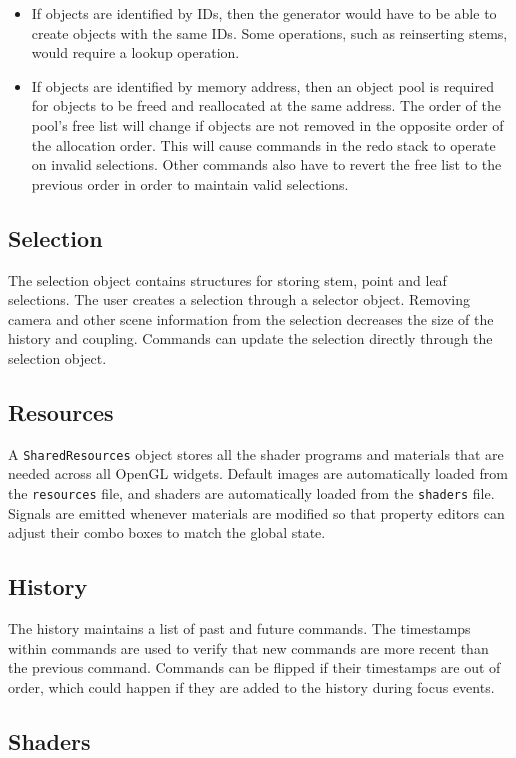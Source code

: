 \documentclass[10pt]{article}
\begin{document}
\begin{itemize}
\item If objects are identified by IDs, then the generator would have to be able to create objects with the same IDs. Some operations, such as reinserting stems, would require a lookup operation.
\item If objects are identified by memory address, then an object pool is required for objects to be freed and reallocated at the same address. The order of the pool's free list will change if objects are not removed in the opposite order of the allocation order. This will cause commands in the redo stack to operate on invalid selections. Other commands also have to revert the free list to the previous order in order to maintain valid selections.
\end{itemize}

\subsection{Selection}
The selection object contains structures for storing stem, point and leaf selections. The user creates a selection through a selector object. Removing camera and other scene information from the selection decreases the size of the history and coupling. Commands can update the selection directly through the selection object.

\subsection{Resources}
A \texttt{SharedResources} object stores all the shader programs and materials that are needed across all OpenGL widgets. Default images are automatically loaded from the \texttt{resources} file, and shaders are automatically loaded from the \texttt{shaders} file. Signals are emitted whenever materials are modified so that property editors can adjust their combo boxes to match the global state.

\subsection{History}
The history maintains a list of past and future commands. The timestamps within commands are used to verify that new commands are more recent than the previous command. Commands can be flipped if their timestamps are out of order, which could happen if they are added to the history during focus events.

\subsection{Shaders}
\end{document}
